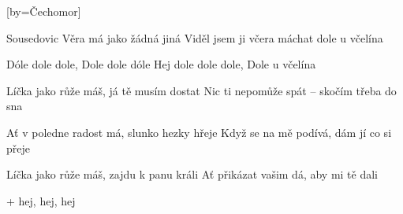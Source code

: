 [by={Čechomor}]

\beginverse{}
\lrep{} Sousedovic Věra má jako žádná jiná
Viděl jsem ji včera máchat dole u včelína \rrep{}
\endverse{}

\beginchorus{}
\lrep{} Dóle dole dole, Dole dole dóle
Hej dole dole dole, Dole u včelína \rrep{}
\endchorus{}

\beginverse{}
\lrep{} Líčka jako růže máš, já tě musím dostat
Nic ti nepomůže spát -- skočím třeba do sna \rrep{}
\endverse{}

\beginchorus{}

\endchorus{}

\beginverse{}
\lrep{} Ať v poledne radost má, slunko hezky hřeje
Když se na mě podívá, dám jí co si přeje \rrep{}
\endverse{}

\beginchorus{}

\endchorus{}

\beginverse{}
\lrep{} Líčka jako růže máš, zajdu k panu králi
Ať přikázat vašim dá, aby mi tě dali \rrep{}
\endverse{}

\beginchorus{}


+ hej, hej, hej
\endchorus{}

\endsong{}
